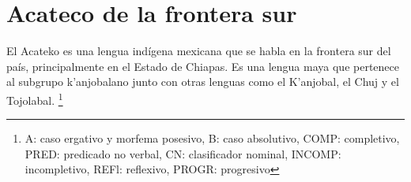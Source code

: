 \section*{Acateco de la frontera sur}

\noindent El Acateko es una lengua indígena mexicana que se habla en la frontera sur del país, principalmente en el Estado de Chiapas. Es una lengua maya que pertenece al subgrupo k'anjobalano junto con otras lenguas como el K'anjobal, el Chuj y el Tojolabal.
\footnote{A: caso ergativo y morfema posesivo, B: caso absolutivo, COMP: completivo, PRED: predicado no verbal, CN: clasificador nominal, INCOMP: incompletivo, REFl: reflexivo, PROGR: progresivo} \vspace{0.3cm}

